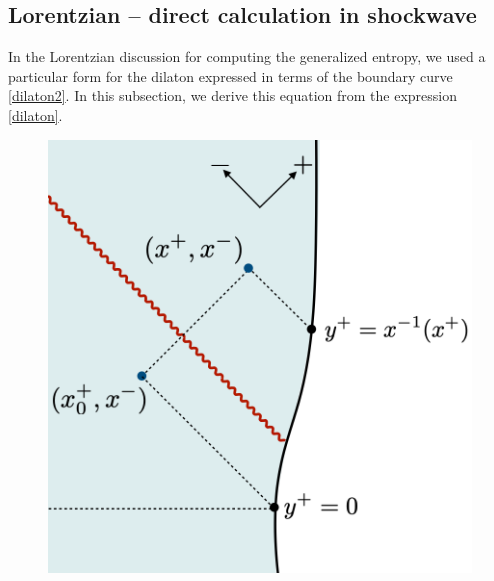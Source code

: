 \documentclass[11pt,oneside,letterpaper]{article}
\numberwithin{equation}{section}
\begin{document}
\begin{spacing}{1.1}
\subsection{Lorentzian -- direct calculation in shockwave}\label{app:dil-lor}

In the Lorentzian discussion for computing the generalized entropy, we used a particular form for the dilaton expressed in terms of the boundary curve \eqref{dilaton2}.
In this subsection, we derive this equation from the expression \eqref{dilaton}.

\begin{figure}
\centering
\includegraphics[scale=0.35]{./figures/Dilatonderive.png}
\caption{}\label{Dilatonderive}
\end{figure}


\end{spacing}
\end{document}
